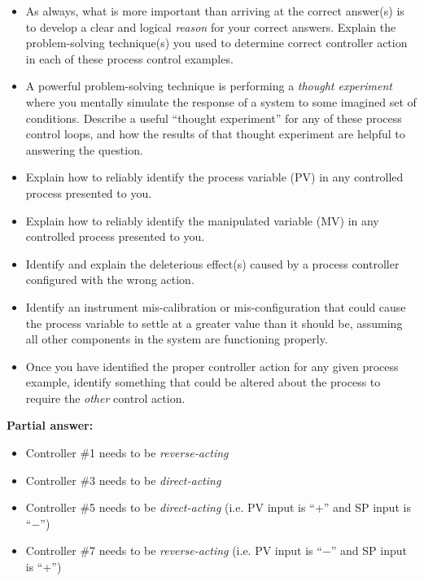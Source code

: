 \begin{itemize}
\item{} As always, what is more important than arriving at the correct answer(s) is to develop a clear and logical {\it reason} for your correct answers.  Explain the problem-solving technique(s) you used to determine correct controller action in each of these process control examples.
\item{} A powerful problem-solving technique is performing a {\it thought experiment} where you mentally simulate the response of a system to some imagined set of conditions.  Describe a useful ``thought experiment'' for any of these process control loops, and how the results of that thought experiment are helpful to answering the question.
\item{} Explain how to reliably identify the process variable (PV) in any controlled process presented to you.
\item{} Explain how to reliably identify the manipulated variable (MV) in any controlled process presented to you.
\item{} Identify and explain the deleterious effect(s) caused by a process controller configured with the wrong action.
\item{} Identify an instrument mis-calibration or mis-configuration that could cause the process variable to settle at a greater value than it should be, assuming all other components in the system are functioning properly.
\item{} Once you have identified the proper controller action for any given process example, identify something that could be altered about the process to require the {\it other} control action.
\end{itemize}







\noindent
{\bf Partial answer:}

\begin{itemize}
\item{} Controller \#1 needs to be {\it reverse-acting}
\item{} Controller \#3 needs to be {\it direct-acting}
\item{} Controller \#5 needs to be {\it direct-acting} (i.e. PV input is ``+'' and SP input is ``$-$'')
\item{} Controller \#7 needs to be {\it reverse-acting} (i.e. PV input is ``$-$'' and SP input is ``+'')
\end{itemize}

